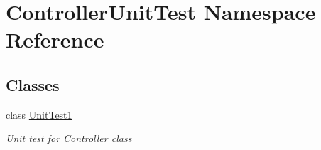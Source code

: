 \hypertarget{namespace_controller_unit_test}{}\section{Controller\+Unit\+Test Namespace Reference}
\label{namespace_controller_unit_test}
\subsection*{Classes}
\begin{DoxyCompactItemize}
\item 
class \hyperlink{class_controller_unit_test_1_1_unit_test1}{Unit\+Test1}
\begin{DoxyCompactList}\small\item\em Unit test for Controller class \end{DoxyCompactList}\end{DoxyCompactItemize}
